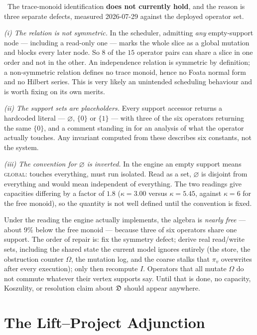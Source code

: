 \begin{hon}\Hon
\Refuted\ The trace-monoid identification \textbf{does not currently
hold}, and the reason is three separate defects, measured 2026-07-29
against the deployed operator set.

\emph{(i) The relation is not symmetric.} In the scheduler, admitting
\emph{any} empty-support node --- including a read-only one --- marks
the whole slice as a global mutation and blocks every later node. So $8$
of the $15$ operator pairs can share a slice in one order and not in the
other. An independence relation is symmetric by definition; a
non-symmetric relation defines no trace monoid, hence no Foata normal
form and no Hilbert series. This is very likely an unintended scheduling
behaviour and is worth fixing on its own merits.

\emph{(ii) The support sets are placeholders.} Every support accessor
returns a hardcoded literal --- $\varnothing$, $\{0\}$ or $\{1\}$ ---
with three of the six operators returning the same $\{0\}$, and a
comment standing in for an analysis of what the operator actually
touches. Any invariant computed from these describes six constants, not
the system.

\emph{(iii) The convention for $\varnothing$ is inverted.} In the engine
an empty support means \textsc{global}: touches everything, must run
isolated. Read as a set, $\varnothing$ is disjoint from everything and
would mean independent of everything. The two readings give capacities
differing by a factor of $1.8$ ($\kappa=3.00$ versus $\kappa=5.45$,
against $\kappa=6$ for the free monoid), so the quantity is not well
defined until the convention is fixed.

Under the reading the engine actually implements, the algebra is
\emph{nearly free} --- about $9\%$ below the free monoid --- because
three of six operators share one support. The order of repair is: fix
the symmetry defect; derive real read/write sets, including the shared
state the current model ignores entirely (the store, the obstruction
counter $\Omega$, the mutation log, and the coarse stalks that $\pi_v$
overwrites after every execution); only then recompute $I$. Operators
that all mutate $\Omega$ do not commute whatever their vertex supports
say. Until that is done, no capacity, Koszulity, or resolution claim
about $\mathfrak{D}$ should appear anywhere.
\end{hon}

\chapter{The Lift--Project Adjunction}\label{ch:adjunction}

